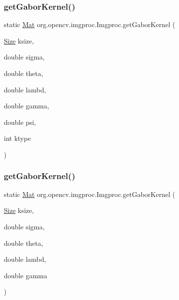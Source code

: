 \subsubsection{\texorpdfstring{get\+Gabor\+Kernel()}{getGaborKernel()}\hspace{0.1cm}{\footnotesize\ttfamily [1/2]}}
{\footnotesize\ttfamily static \mbox{\hyperlink{classorg_1_1opencv_1_1core_1_1_mat}{Mat}} org.\+opencv.\+imgproc.\+Imgproc.\+get\+Gabor\+Kernel (\begin{DoxyParamCaption}\item[{\mbox{\hyperlink{classorg_1_1opencv_1_1core_1_1_size}{Size}}}]{ksize,  }\item[{double}]{sigma,  }\item[{double}]{theta,  }\item[{double}]{lambd,  }\item[{double}]{gamma,  }\item[{double}]{psi,  }\item[{int}]{ktype }\end{DoxyParamCaption})\hspace{0.3cm}{\ttfamily [static]}}

\mbox{\label{classorg_1_1opencv_1_1imgproc_1_1_imgproc_a6a76e5878eee9211bfca7e7d63802cc1}} 
\subsubsection{\texorpdfstring{get\+Gabor\+Kernel()}{getGaborKernel()}\hspace{0.1cm}{\footnotesize\ttfamily [2/2]}}
{\footnotesize\ttfamily static \mbox{\hyperlink{classorg_1_1opencv_1_1core_1_1_mat}{Mat}} org.\+opencv.\+imgproc.\+Imgproc.\+get\+Gabor\+Kernel (\begin{DoxyParamCaption}\item[{\mbox{\hyperlink{classorg_1_1opencv_1_1core_1_1_size}{Size}}}]{ksize,  }\item[{double}]{sigma,  }\item[{double}]{theta,  }\item[{double}]{lambd,  }\item[{double}]{gamma }\end{DoxyParamCaption})\hspace{0.3cm}{\ttfamily [static]}}

